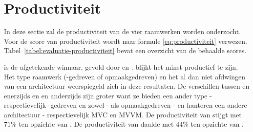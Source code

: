 \section{Productiviteit}
\label{sec:evaluatie-productiviteit}

In deze sectie zal de productiviteit van de vier raamwerken worden onderzocht.
Voor de score van productiviteit wordt naar formule \ref{eq:productiviteit} verwezen.
Tabel~\ref{tabel:evaluatie-productiviteit} bevat een overzicht van de behaalde scores.

\begin{table}[H]
\centering
{}
\caption{Overzicht van productiviteit voor \st{}~(\sta), \kendo{}~(\kendoa), \jqm{}~(\jqma) en \lungo{}~(\lungoa).}
\label{tabel:evaluatie-productiviteit}
\end{table}

\lungo{} is de afgetekende winnaar,  gevold door \kendo{} en \jqm{}. 
\st{} blijkt het minst productief te zijn.
Het type raamwerk (\js-gedreven of opmaakgedreven) en het al dan niet afdwingen van een architectuur weerspiegeld zich in deze resultaten.
De verschillen tussen \jqm{} en \lungo{} enerzijds en \st{} en \kendo{} anderzijds zijn groter want ze bieden een ander type - respectievelijk \js-gedreven en zowel \js- als opmaakgedreven - en hanteren een andere architectuur - respectievelijk MVC en MVVM.
De productiviteit van \lungo{} stijgt met $71\%$ ten opzichte van \jqm{}.
De productiviteit van \kendo{} daalde met $44\%$ ten opzichte van \st{}.

